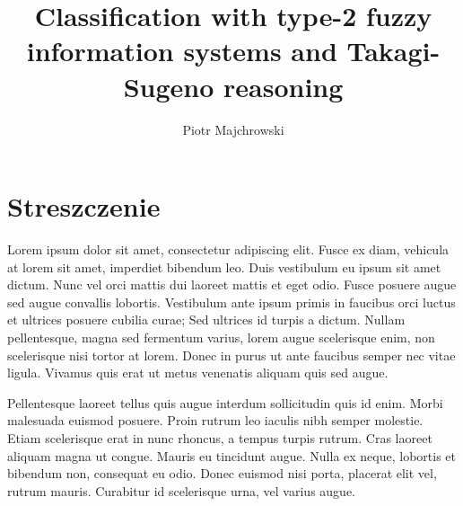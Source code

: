 \documentclass[english,masters]{wizthesis}
\author{Piotr Majchrowski}
\title{Classification with type-2 fuzzy information systems and Takagi-Sugeno reasoning}
\begin{document}
\frontmatter %

\maketitle

\chapter*{Streszczenie}

Lorem ipsum dolor sit amet, consectetur adipiscing elit. Fusce ex diam, vehicula
at lorem sit amet, imperdiet bibendum leo. Duis vestibulum eu ipsum sit amet
dictum. Nunc vel orci mattis dui laoreet mattis et eget odio. Fusce posuere
augue sed augue convallis lobortis. Vestibulum ante ipsum primis in faucibus
orci luctus et ultrices posuere cubilia curae; Sed ultrices id turpis a dictum.
Nullam pellentesque, magna sed fermentum varius, lorem augue scelerisque enim,
non scelerisque nisi tortor at lorem. Donec in purus ut ante faucibus semper nec
vitae ligula. Vivamus quis erat ut metus venenatis aliquam quis sed augue.

Pellentesque laoreet tellus quis augue interdum sollicitudin quis id enim. Morbi
malesuada euismod posuere. Proin rutrum leo iaculis nibh semper molestie. Etiam
scelerisque erat in nunc rhoncus, a tempus turpis rutrum. Cras laoreet aliquam
magna ut congue. Mauris eu tincidunt augue. Nulla ex neque, lobortis et bibendum
non, consequat eu odio. Donec euismod nisi porta, placerat elit vel, rutrum
mauris. Curabitur id scelerisque urna, vel varius augue.

\tableofcontents

\mainmatter %
\end{document}
